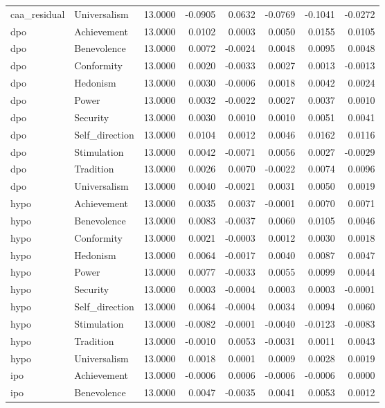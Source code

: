 \begin{tabular}{llrrrrrr}
caa\_residual & Universalism & 13.0000 & -0.0905 & 0.0632 & -0.0769 & -0.1041 & -0.0272 \\
dpo & Achievement & 13.0000 & 0.0102 & 0.0003 & 0.0050 & 0.0155 & 0.0105 \\
dpo & Benevolence & 13.0000 & 0.0072 & -0.0024 & 0.0048 & 0.0095 & 0.0048 \\
dpo & Conformity & 13.0000 & 0.0020 & -0.0033 & 0.0027 & 0.0013 & -0.0013 \\
dpo & Hedonism & 13.0000 & 0.0030 & -0.0006 & 0.0018 & 0.0042 & 0.0024 \\
dpo & Power & 13.0000 & 0.0032 & -0.0022 & 0.0027 & 0.0037 & 0.0010 \\
dpo & Security & 13.0000 & 0.0030 & 0.0010 & 0.0010 & 0.0051 & 0.0041 \\
dpo & Self\_direction & 13.0000 & 0.0104 & 0.0012 & 0.0046 & 0.0162 & 0.0116 \\
dpo & Stimulation & 13.0000 & 0.0042 & -0.0071 & 0.0056 & 0.0027 & -0.0029 \\
dpo & Tradition & 13.0000 & 0.0026 & 0.0070 & -0.0022 & 0.0074 & 0.0096 \\
dpo & Universalism & 13.0000 & 0.0040 & -0.0021 & 0.0031 & 0.0050 & 0.0019 \\
hypo & Achievement & 13.0000 & 0.0035 & 0.0037 & -0.0001 & 0.0070 & 0.0071 \\
hypo & Benevolence & 13.0000 & 0.0083 & -0.0037 & 0.0060 & 0.0105 & 0.0046 \\
hypo & Conformity & 13.0000 & 0.0021 & -0.0003 & 0.0012 & 0.0030 & 0.0018 \\
hypo & Hedonism & 13.0000 & 0.0064 & -0.0017 & 0.0040 & 0.0087 & 0.0047 \\
hypo & Power & 13.0000 & 0.0077 & -0.0033 & 0.0055 & 0.0099 & 0.0044 \\
hypo & Security & 13.0000 & 0.0003 & -0.0004 & 0.0003 & 0.0003 & -0.0001 \\
hypo & Self\_direction & 13.0000 & 0.0064 & -0.0004 & 0.0034 & 0.0094 & 0.0060 \\
hypo & Stimulation & 13.0000 & -0.0082 & -0.0001 & -0.0040 & -0.0123 & -0.0083 \\
hypo & Tradition & 13.0000 & -0.0010 & 0.0053 & -0.0031 & 0.0011 & 0.0043 \\
hypo & Universalism & 13.0000 & 0.0018 & 0.0001 & 0.0009 & 0.0028 & 0.0019 \\
ipo & Achievement & 13.0000 & -0.0006 & 0.0006 & -0.0006 & -0.0006 & 0.0000 \\
ipo & Benevolence & 13.0000 & 0.0047 & -0.0035 & 0.0041 & 0.0053 & 0.0012 \\

\end{tabular}
